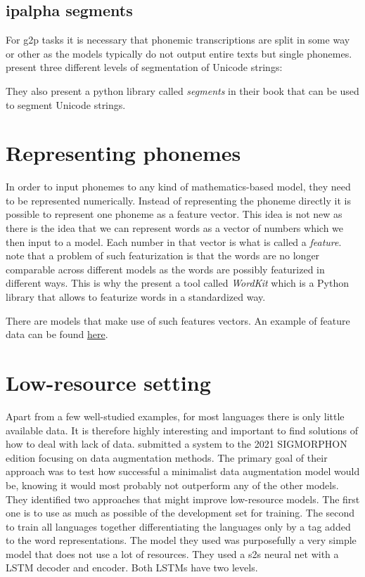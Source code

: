 \subsection{\ac{ipalpha} segments}
For \ac{g2p} tasks it is necessary that phonemic transcriptions are split in some way or other as the models typically do not output entire texts but single phonemes. \citet{unicode-lingu} present three different levels of segmentation of Unicode strings:



They also present a python library called \textit{segments} in their book that can be used to segment Unicode strings. 

 

\section{Representing phonemes}
\label{phon-features}
In order to input phonemes to any kind of mathematics-based model, they need to be represented numerically. Instead of representing the phoneme directly it is possible to represent one phoneme as a feature vector. This idea is not new as there is the idea that we can represent words as a vector of numbers which we then input to a model. Each number in that vector is what is called a \textit{feature}. \citet{tulkens-etal-2018-wordkit} note that a problem of such featurization is that the words are no longer comparable across different models as the words are possibly featurized in different ways. This is why the present a tool called \textit{WordKit} which is a Python library that allows to featurize words in a standardized way.


There are models that make use of such features vectors. An example of feature data can be found \href{https://github.com/uiuc-sst/g2ps}{here}.

\section{Low-resource setting}
Apart from a few well-studied examples, for most languages there is only little available data. It is therefore highly interesting and important to find solutions of how to deal with lack of data. \cite{hammond-2021-data} submitted a system to the 2021 SIGMORPHON edition focusing on data augmentation methods. The primary goal of their approach was to test how successful a minimalist data augmentation model would be, knowing it would most probably not outperform any of the other models. They identified two approaches that might improve low-resource models. The first one is to use as much as possible of the development set for training. The second to train all languages together differentiating the languages only by a tag added to the word representations. The model they used was purposefully a very simple model that does not use a lot of resources. They used a \ac{s2s} neural net with a LSTM decoder and encoder. Both LSTMs have two levels. 


